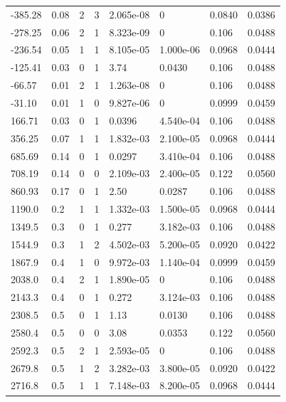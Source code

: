 \documentclass[preview]{standalone}
\begin{document}
{{\begin{tabular}{L{1.2cm}C{1.2cm} C{0.3cm}C{0.5cm} C{1.4cm}C{1.4cm} C{1.4cm}C{1.4cm}}
  -385.28  &  0.08  & 2     &  3 &  2.065e-08  & 0  & 0.0840 &  0.0386   \\ 
  -278.25  &  0.06  & 2     &  1 &  8.323e-09  & 0  & 0.106 &  0.0488   \\ 
  -236.54  &  0.05  & 1     &  1 &  8.105e-05  & 1.000e-06  & 0.0968 &  0.0444   \\ 
  -125.41  &  0.03  & 0     &  1 &  3.74  & 0.0430  & 0.106 &  0.0488   \\ 
  -66.57  &  0.01  & 2     &  1 &  1.263e-08  & 0  & 0.106 &  0.0488   \\ 
  -31.10  &  0.01  & 1     &  0 &  9.827e-06  & 0  & 0.0999 &  0.0459   \\ 
  166.71  &  0.03  & 0     &  1 &  0.0396  & 4.540e-04  & 0.106 &  0.0488   \\ 
  356.25  &  0.07  & 1     &  1 &  1.832e-03  & 2.100e-05  & 0.0968 &  0.0444   \\ 
  685.69  &  0.14  & 0     &  1 &  0.0297  & 3.410e-04  & 0.106 &  0.0488   \\ 
  708.19  &  0.14  & 0     &  0 &  2.109e-03  & 2.400e-05  & 0.122 &  0.0560   \\ 
  860.93  &  0.17  & 0     &  1 &  2.50  & 0.0287  & 0.106 &  0.0488   \\ 
  1190.0  &   0.2  & 1     &  1 &  1.332e-03  & 1.500e-05  & 0.0968 &  0.0444   \\ 
  1349.5  &   0.3  & 0     &  1 &  0.277  & 3.182e-03  & 0.106 &  0.0488   \\ 
  1544.9  &   0.3  & 1     &  2 &  4.502e-03  & 5.200e-05  & 0.0920 &  0.0422   \\ 
  1867.9  &   0.4  & 1     &  0 &  9.972e-03  & 1.140e-04  & 0.0999 &  0.0459   \\ 
  2038.0  &   0.4  & 2     &  1 &  1.890e-05  & 0  & 0.106 &  0.0488   \\ 
  2143.3  &   0.4  & 0     &  1 &  0.272  & 3.124e-03  & 0.106 &  0.0488   \\ 
  2308.5  &   0.5  & 0     &  1 &  1.13  & 0.0130  & 0.106 &  0.0488   \\ 
  2580.4  &   0.5  & 0     &  0 &  3.08  & 0.0353  & 0.122 &  0.0560   \\ 
  2592.3  &   0.5  & 2     &  1 &  2.593e-05  & 0  & 0.106 &  0.0488   \\ 
  2679.8  &   0.5  & 1     &  2 &  3.282e-03  & 3.800e-05  & 0.0920 &  0.0422   \\ 
  2716.8  &   0.5  & 1     &  1 &  7.148e-03  & 8.200e-05  & 0.0968 &  0.0444   \\ 

\end{tabular}}}
\end{document}
